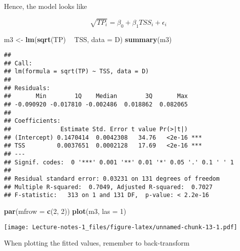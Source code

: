 \documentclass[
]{book}
\newenvironment{Shaded}{\begin{snugshade}}{\end{snugshade}}
\newcommand{\DataTypeTok}[1]{\textcolor[rgb]{0.13,0.29,0.53}{#1}}
\newcommand{\DecValTok}[1]{\textcolor[rgb]{0.00,0.00,0.81}{#1}}
\newcommand{\KeywordTok}[1]{\textcolor[rgb]{0.13,0.29,0.53}{\textbf{#1}}}
\newcommand{\NormalTok}[1]{#1}
\newcommand{\OperatorTok}[1]{\textcolor[rgb]{0.81,0.36,0.00}{\textbf{#1}}}
\newcommand{\OtherTok}[1]{\textcolor[rgb]{0.56,0.35,0.01}{#1}}
\newcommand{\StringTok}[1]{\textcolor[rgb]{0.31,0.60,0.02}{#1}}
\begin{document}
Hence, the model looks like

\[\sqrt{TP_i} = \beta_0 + \beta_1 TSS_i + \epsilon_i\]

\begin{Shaded}
\begin{Highlighting}[]
\NormalTok{m3 <-}\StringTok{ }\KeywordTok{lm}\NormalTok{(}\KeywordTok{sqrt}\NormalTok{(TP) }\OperatorTok{~}\StringTok{ }\NormalTok{TSS, }\DataTypeTok{data =}\NormalTok{ D)}
\KeywordTok{summary}\NormalTok{(m3)}
\end{Highlighting}
\end{Shaded}

\begin{verbatim}
## 
## Call:
## lm(formula = sqrt(TP) ~ TSS, data = D)
## 
## Residuals:
##       Min        1Q    Median        3Q       Max 
## -0.090920 -0.017810 -0.002486  0.018862  0.082065 
## 
## Coefficients:
##              Estimate Std. Error t value Pr(>|t|)    
## (Intercept) 0.1470414  0.0042308   34.76   <2e-16 ***
## TSS         0.0037651  0.0002128   17.69   <2e-16 ***
## ---
## Signif. codes:  0 '***' 0.001 '**' 0.01 '*' 0.05 '.' 0.1 ' ' 1
## 
## Residual standard error: 0.03231 on 131 degrees of freedom
## Multiple R-squared:  0.7049, Adjusted R-squared:  0.7027 
## F-statistic:   313 on 1 and 131 DF,  p-value: < 2.2e-16
\end{verbatim}

\begin{Shaded}
\begin{Highlighting}[]
\KeywordTok{par}\NormalTok{(}\DataTypeTok{mfrow =} \KeywordTok{c}\NormalTok{(}\DecValTok{2}\NormalTok{, }\DecValTok{2}\NormalTok{))}
\KeywordTok{plot}\NormalTok{(m3, }\DataTypeTok{las =} \DecValTok{1}\NormalTok{)}
\end{Highlighting}
\end{Shaded}

\texttt{[image: Lecture-notes-1\_files/figure-latex/unnamed-chunk-13-1.pdf]}

When plotting the fitted values, remember to back-transform

\begin{Shaded}
\end{Shaded}
\end{document}

